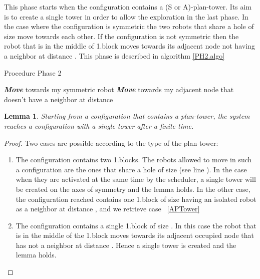 \documentclass[12pt]{llncs}
\newtheorem{lem}{Lemma}
\begin{document}
This phase starts when the configuration contains a (S or A)-plan-tower. Its aim is to create a single tower in order to allow the exploration in the last phase.
In the case where the configuration is symmetric the two robots that share a hole of size  move towards each other. If the configuration is not symmetric then the robot that is in the middle of 1.block moves towards its adjacent node not having a neighbor at distance . This phase is described in algorithm \ref{PH2.algo}

\begin{algorithm}[H]
\caption{Procedure Phase 2}
\label{PH2.algo}
\begin{algorithmic}[1]

            \State \textit{\textbf{Move}} towards my symmetric robot
         \EndIf
     \Else
             \State \textit{\textbf{Move}} towards my adjacent node that doesn't have a neighbor at distance 
        \EndIf
    \EndIf
\EndIf
\end{algorithmic}
\end{algorithm}

\begin{lem}
\label{lem:PH2}
Starting from a configuration that contains a plan-tower, the system reaches a configuration with a single tower after a finite time.
\end{lem}

\begin{proof}
Two cases are possible according to the type of the plan-tower:
\begin{enumerate}
\item{The configuration contains two 1.blocks}. The robots allowed to move in such a configuration are the ones that share a hole of size  (see line ). In the case when they are activated at the same time by the scheduler, a single tower will be created on the axes of symmetry and the lemma holds. In the other case, the configuration reached contains one 1.block of size  having an isolated robot as a neighbor at distance , and we retrieve case ~\ref{APTower} 
\item\label{APTower}{The configuration contains a single 1.block of size }. In this case the robot that is in the middle of the 1.block moves towards its adjacent occupied node that has not a neighbor at distance . Hence a single tower is created and the lemma holds.
\end{enumerate}
\end{proof}
\end{document}

